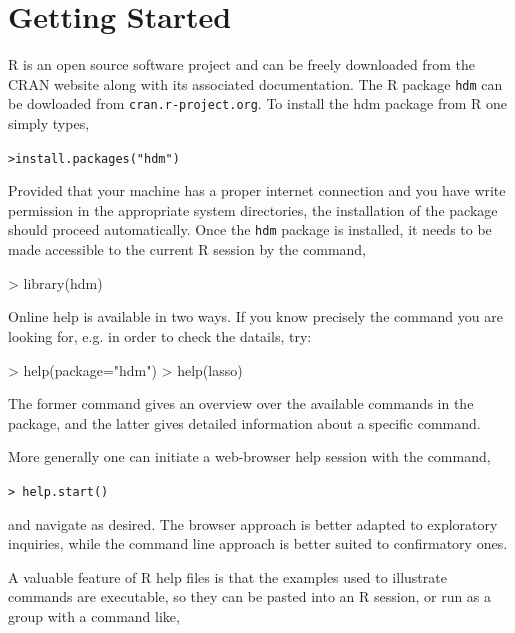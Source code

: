 \documentclass{amsart}
\newcommand{\Rpackage}[1]{{\texttt{#1}}}
\newcommand{\R}{{\normalfont\textsf{R }}{}}
\begin{document}
\section{Getting Started}

\R is an open source software project and can be freely downloaded from the CRAN
website along with its associated documentation. The \R package \Rpackage{hdm} can be dowloaded from \texttt{cran.r-project.org}. To install the hdm package from \R one simply types,

\vspace{2mm}
\noindent
\texttt{>install.packages("hdm")}

\vspace{2mm}
\noindent
Provided that your machine has a proper internet connection and you
have write permission in the appropriate system directories,
the installation of the package should proceed automatically.
Once the \texttt{hdm} package is installed, it needs
to be made accessible to the current \R session by the command,
\begin{Schunk}
\begin{Sinput}
> library(hdm)
\end{Sinput}
\end{Schunk}


Online help is available in two ways.  If you know
precisely the command you are
looking for, e.g. in order to check the datails, try:
\begin{Schunk}
\begin{Sinput}
> help(package="hdm")
> help(lasso)
\end{Sinput}
\end{Schunk}
The former command gives an overview over the available commands in the package, and
the latter gives detailed information about a specific command.

More generally one can initiate a web-browser help session with the command,

\vspace{2mm}
\noindent
\texttt{> help.start()}

\vspace{2mm}
\noindent
and navigate as desired.  The browser approach is better adapted to exploratory
inquiries, while the command line approach is better suited to confirmatory ones.

A valuable feature of \R help files is that the examples used to illustrate commands
are executable, so they can be pasted into an \R session, or run as a group with
a command like,
\end{document}
